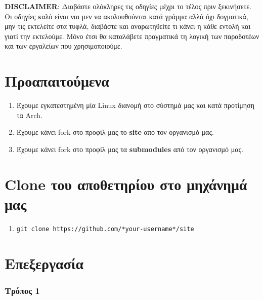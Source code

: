 \documentclass[
]{article}
\author{}
\date{}
\begin{document}
\textbf{DISCLAIMER}: Διαβάστε ολόκληρες τις οδηγίες μέχρι το τέλος πριν
ξεκινήσετε. Οι οδηγίες καλό είναι ναι μεν να ακολουθούνται κατά γράμμα
αλλά όχι δογματικά, μην τις εκτελείτε στα τυφλά, διαβάστε και
αναρωτηθείτε τι κάνει η κάθε εντολή και γιατί την εκτελούμε. Μόνο έτσι
θα καταλάβετε πραγματικά τη λογική των παραδοτέων και των εργαλείων που
χρησιμοποιούμε.

\hypertarget{ux3c0ux3c1ux3bfux3b1ux3c0ux3b1ux3b9ux3c4ux3bfux3cdux3bcux3b5ux3bdux3b1}{%
\section{Προαπαιτούμενα}\label{ux3c0ux3c1ux3bfux3b1ux3c0ux3b1ux3b9ux3c4ux3bfux3cdux3bcux3b5ux3bdux3b1}}

\begin{enumerate}
\item
  Έχουμε εγκατεστημένη μία Linux διανομή στο σύστημά μας και κατά
  προτίμηση τα Arch.
\item
  Έχουμε κάνει fork στο προφίλ μας το \textbf{site} από τον οργανισμό
  μας.
\item
  Έχουμε κάνει fork στο προφίλ μας τα \textbf{submodules} από τον
  οργανισμό μας.
\end{enumerate}

\hypertarget{clone-ux3c4ux3bfux3c5-ux3b1ux3c0ux3bfux3b8ux3b5ux3c4ux3b7ux3c1ux3afux3bfux3c5-ux3c3ux3c4ux3bf-ux3bcux3b7ux3c7ux3acux3bdux3b7ux3bcux3ac-ux3bcux3b1ux3c2}{%
\section{Clone του αποθετηρίου στο μηχάνημά
μας}\label{clone-ux3c4ux3bfux3c5-ux3b1ux3c0ux3bfux3b8ux3b5ux3c4ux3b7ux3c1ux3afux3bfux3c5-ux3c3ux3c4ux3bf-ux3bcux3b7ux3c7ux3acux3bdux3b7ux3bcux3ac-ux3bcux3b1ux3c2}}

\begin{enumerate}
\item
  \texttt{git~clone~https://github.com/*your-username*/site}
\end{enumerate}

\hypertarget{ux3b5ux3c0ux3b5ux3beux3b5ux3c1ux3b3ux3b1ux3c3ux3afux3b1}{%
\section{Επεξεργασία}\label{ux3b5ux3c0ux3b5ux3beux3b5ux3c1ux3b3ux3b1ux3c3ux3afux3b1}}

\hypertarget{ux3c4ux3c1ux3ccux3c0ux3bfux3c2-1}{%
\subsubsection{Τρόπος 1}\label{ux3c4ux3c1ux3ccux3c0ux3bfux3c2-1}}
\end{document}
